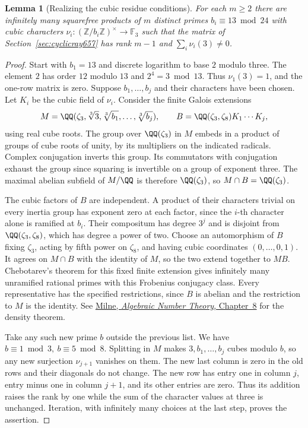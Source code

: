 \documentclass[a4paper,11pt]{article}
\newtheorem{lemma}[proposition]{Lemma}
\theoremstyle{definition}
\theoremstyle{remark}
\newcommand{\ZZ}{\mathbb Z}\newcommand{\ord}{\operatorname{ord}}
\numberwithin{equation}{section}
\begin{document}
\begin{lemma}[Realizing the cubic residue conditions]
\leavevmode\label{lem:cubicconductors669}
For each \(m\ge2\) there are infinitely many squarefree products
of \(m\) distinct primes \(b_i\equiv13\bmod24\) with cubic
characters \(\nu_i:(\ZZ/b_i\ZZ)^\times\to\mathbb F_3\) such that
the matrix of Section~\ref{sec:cyclicray657} has rank \(m-1\)
and \(\sum_i\nu_i(3)\ne0\).
\end{lemma}
\begin{proof}
Start with \(b_1=13\) and discrete logarithm to base \(2\)
modulo three. The element \(2\) has order \(12\) modulo \(13\)
and \(2^4=3\bmod13\). Thus \(\nu_1(3)=1\), and the one-row
matrix is zero. Suppose \(b_1,\dots,b_j\) and their characters
have been chosen. Let \(K_i\) be the cubic field of \(\nu_i\).
Consider the finite Galois extensions
\[
 M=\QQ(\zeta_3,\sqrt[3]{3},\sqrt[3]{b_1},\ldots,\sqrt[3]{b_j}),
 \qquad B=\QQ(\zeta_3,\zeta_8)K_1\cdots K_j ,
\]
using real cube roots. The group over \(\QQ(\zeta_3)\) in \(M\)
embeds in a product of groups of cube roots of unity, by its
multipliers on the indicated radicals. Complex conjugation
inverts this group. Its commutators with conjugation exhaust
the group since squaring is invertible on a group of exponent
three. The maximal abelian subfield of \(M/\QQ\) is therefore
\(\QQ(\zeta_3)\), so \(M\cap B=\QQ(\zeta_3)\).

The cubic factors of \(B\) are independent. A product of their
characters trivial on every inertia group has exponent zero at
each factor, since the \(i\)-th character alone is ramified at
\(b_i\). Their compositum has degree \(3^j\) and is disjoint from
\(\QQ(\zeta_3,\zeta_8)\), which has degree a power of two.
Choose an automorphism of \(B\) fixing \(\zeta_3\), acting
by fifth power on \(\zeta_8\), and having cubic coordinates
\((0,\ldots,0,1)\). It agrees on \(M\cap B\) with the identity
of \(M\), so the two extend together to \(MB\). Chebotarev's
theorem for this fixed finite extension gives infinitely many
unramified rational primes with this Frobenius conjugacy class.
Every representative has the specified restrictions, since \(B\)
is abelian and the restriction to \(M\) is the identity.
See \href{https://www.jmilne.org/math/CourseNotes/ANT.pdf}{Milne,
\emph{Algebraic Number Theory}, Chapter~8} for the density theorem.

Take any such new prime \(b\) outside the previous list. We have
\(b\equiv1\bmod3,\ b\equiv5\bmod8\). Splitting in \(M\) makes
\(3,b_1,\ldots,b_j\) cubes modulo \(b\), so any new surjection
\(\nu_{j+1}\) vanishes on them. The new last column is zero in
the old rows and their diagonals do not change. The new row has
entry one in column \(j\), entry minus one in column \(j+1\),
and its other entries are zero. Thus its addition raises the
rank by one while the sum of the character values at three is
unchanged. Iteration, with infinitely many choices at the last
step, proves the assertion.
\end{proof}
\end{document}
